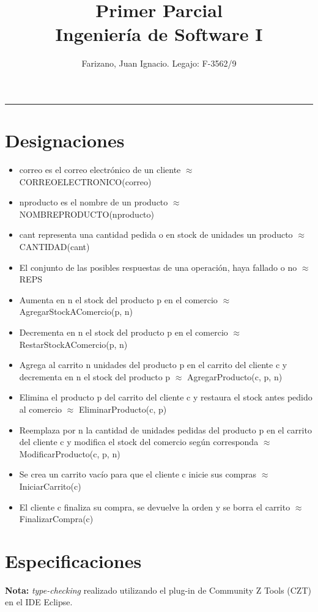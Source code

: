 \documentclass[11pt]{article}
\title{
    Primer Parcial \\
    \large Ingeniería de Software I}
\author{Farizano, Juan Ignacio. Legajo: F-3562/9}
\date{}
\begin{document}
\maketitle

\rule{\textwidth}{1pt}

\section*{Designaciones}
\begin{itemize}
\item correo es el correo electrónico de un cliente $\approx$ CORREOELECTRONICO(correo)
\item nproducto es el nombre de un producto $\approx$ NOMBREPRODUCTO(nproducto)
\item cant representa una cantidad pedida o en stock de unidades un producto $\approx$ CANTIDAD(cant)
\item El conjunto de las posibles respuestas de una operación, haya fallado o no $\approx$ REPS
\item Aumenta en n el stock del producto p en el comercio $\approx$ AgregarStockAComercio(p, n)
\item Decrementa en n el stock del producto p en el comercio $\approx$ RestarStockAComercio(p, n)
\item Agrega al carrito n unidades del producto p en el carrito del cliente c y 
      decrementa en n el stock del producto p $\approx$ AgregarProducto(c, p, n)
\item Elimina el producto p del carrito del cliente c y restaura el stock antes pedido al comercio
$\approx$ EliminarProducto(c, p)
\item Reemplaza por n la cantidad de unidades pedidas del producto p en el carrito
del cliente c y modifica el stock del comercio según corresponda $\approx$ ModificarProducto(c, p, n)
\item Se crea un carrito vacío para que el cliente c inicie sus compras $\approx$ IniciarCarrito(c)
\item El cliente c finaliza su compra, se devuelve la orden y se borra el carrito $\approx$ FinalizarCompra(c)
\end{itemize}

\section*{Especificaciones}

\textbf{Nota:} \emph{type-checking} realizado utilizando el plug-in de Community Z Tools (CZT)
en el IDE Eclipse.
\end{document}
